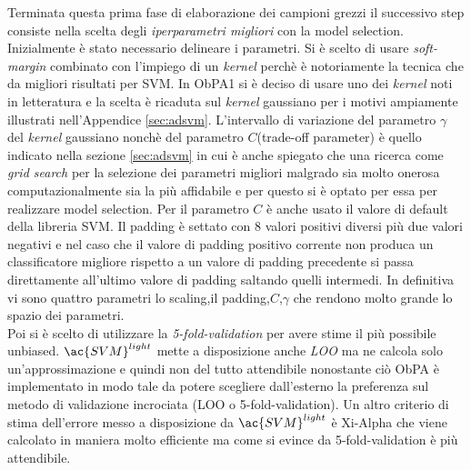 Terminata questa prima fase di elaborazione dei campioni grezzi il successivo step consiste nella scelta degli \textit{iperparametri migliori} con la model selection. Inizialmente è stato necessario delineare i parametri. Si è scelto di usare  \textit{soft-margin} combinato con l'impiego di un \textit{kernel} perchè è notoriamente la tecnica che da migliori risultati per \ac{SVM}. In \ac{ObPA}1  si è deciso di usare uno dei \textit{kernel} noti in letteratura e la scelta è ricaduta sul \textit{kernel} gaussiano per i motivi ampiamente illustrati nell'Appendice \ref{sec:adsvm}. L'intervallo di variazione del parametro $\gamma$ del \textit{kernel} gaussiano nonchè del parametro $C$(trade-off parameter) è quello indicato nella sezione \ref{sec:adsvm} in cui è anche spiegato che una ricerca come \textit{grid search} per la selezione dei parametri migliori malgrado sia molto onerosa computazionalmente sia la più affidabile e per questo si è optato per essa per realizzare model selection.  Per il parametro $C$ è anche usato il valore di default della libreria \ac{SVM}. Il padding è settato con 8 valori positivi diversi più due valori negativi e nel caso che il valore di padding positivo corrente non produca un classificatore migliore rispetto a un valore di padding precedente si passa direttamente all'ultimo valore di padding saltando quelli intermedi. In definitiva vi sono quattro parametri lo scaling,il padding,$C$,$\gamma$ che rendono molto grande lo spazio dei parametri.\\
 Poi si è scelto di utilizzare la \textit{5-fold-validation} per avere stime il più possibile unbiased. $\ac{SVM}^{light}$ mette a disposizione anche \textit{LOO} ma ne calcola solo un'approssimazione e quindi non del tutto attendibile nonostante ciò  \ac{ObPA} è implementato in modo tale da potere scegliere dall'esterno la preferenza sul metodo di validazione incrociata (LOO o 5-fold-validation).  Un altro criterio di stima dell'errore messo a disposizione da $\ac{SVM}^{light}$ è  Xi-Alpha che viene calcolato in maniera molto efficiente ma come si evince da \cite{Duan03} 5-fold-validation è più attendibile.  
 
